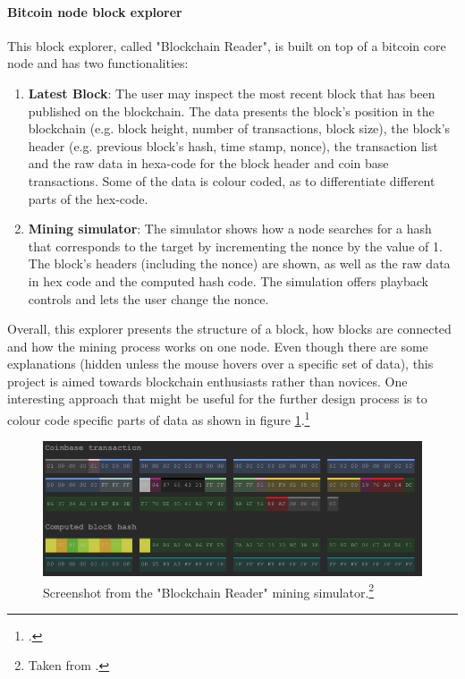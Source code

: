 \paragraph{Bitcoin node block explorer} This block explorer, called "Blockchain Reader", is built on top of a bitcoin core node and has two functionalities:
\begin{enumerate}
    \item \textbf{Latest Block}: The user may inspect the most recent block that has been published on the blockchain. The data presents the block's position in the blockchain (e.g. block height, number of transactions, block size), the block's header (e.g. previous block's hash, time stamp, nonce), the transaction list and the raw data in hexa-code for the block header and coin base transactions. Some of the data is colour coded, as to differentiate different parts of the hex-code.
    \item \textbf{Mining simulator}: The simulator shows how a node searches for a hash that corresponds to the target by incrementing the nonce by the value of 1. The block's headers (including the nonce) are shown, as well as the raw data in hex code and the computed hash code. The simulation offers playback controls and lets the user change the nonce.
\end{enumerate}
Overall, this explorer presents the structure of a block, how blocks are connected and how the mining process works on one node. Even though there are some explanations (hidden unless the mouse hovers over a specific set of data), this project is aimed towards blockchain enthusiasts rather than novices. One interesting approach that might be useful for the further design process is to colour code specific parts of data as shown in figure \ref{fig:BlockchainReader}.\footcite[Cf.][]{JornCYoghBlockchainReader2017}

\begin{figure}
    \centering
    \includegraphics[width=\linewidth]{latex-vorlage_v1.5/graphics/Bildschirmfo.png}
    \caption[Screenshot from the "Blockchain Reader" mining simulator.]{Screenshot from the "Blockchain Reader" mining simulator.\footnote{Taken from \cite{JornCYoghBlockchainReader2017}.}}
    \label{fig:BlockchainReader}
\end{figure}

